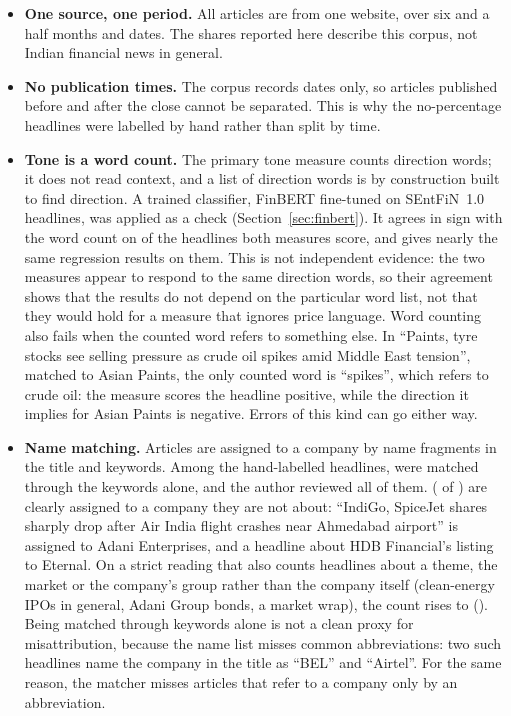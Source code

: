 \documentclass[11pt]{article}
\begin{document}
\begin{itemize}
  \item \textbf{One source, one period.} All articles are from one website, over six and a half months and \nDates{} dates. The shares reported here describe this corpus, not Indian financial news in general.
  \item \textbf{No publication times.} The corpus records dates only, so articles published before and after the close cannot be separated. This is why the no-percentage headlines were labelled by hand rather than split by time.
  \item \textbf{Tone is a word count.} The primary tone measure counts direction words; it does not read context, and a list of direction words is by construction built to find direction. A trained classifier, FinBERT fine-tuned on SEntFiN~1.0 headlines, was applied as a check (Section~\ref{sec:finbert}). It agrees in sign with the word count on \fbAgree{} of the headlines both measures score, and gives nearly the same regression results on them. This is not independent evidence: the two measures appear to respond to the same direction words, so their agreement shows that the results do not depend on the particular word list, not that they would hold for a measure that ignores price language. Word counting also fails when the counted word refers to something else. In ``Paints, tyre stocks see selling pressure as crude oil spikes amid Middle East tension'', matched to Asian Paints, the only counted word is ``spikes'', which refers to crude oil: the measure scores the headline positive, while the direction it implies for Asian Paints is negative. Errors of this kind can go either way.
  \item \textbf{Name matching.} Articles are assigned to a company by name fragments in the title and keywords. Among the \nLabelled{} hand-labelled headlines, \nKeywordOnly{} were matched through the keywords alone, and the author reviewed all of them. \nMisClear{} (\shareMisClear{} of \nLabelled{}) are clearly assigned to a company they are not about: ``IndiGo, SpiceJet shares sharply drop after Air India flight crashes near Ahmedabad airport'' is assigned to Adani Enterprises, and a headline about HDB Financial's listing to Eternal. On a strict reading that also counts headlines about a theme, the market or the company's group rather than the company itself (clean-energy IPOs in general, Adani Group bonds, a market wrap), the count rises to \nMisUpper{} (\shareMisUpper{}). Being matched through keywords alone is not a clean proxy for misattribution, because the name list misses common abbreviations: two such headlines name the company in the title as ``BEL'' and ``Airtel''. For the same reason, the matcher misses articles that refer to a company only by an abbreviation.

\end{itemize}
\end{document}
